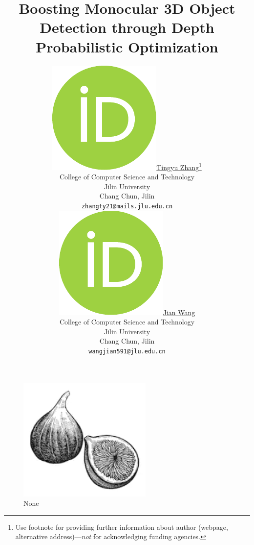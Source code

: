 \documentclass{article}
\title{Boosting Monocular 3D Object Detection through Depth Probabilistic Optimization}
\author{ \href{https://orcid.org/0000-0002-2277-8871}{\includegraphics[scale=0.06]{orcid.pdf}\hspace{1mm}Tingyu Zhang}\thanks{Use footnote for providing further
		information about author (webpage, alternative
		address)---\emph{not} for acknowledging funding agencies.} \\
	College of Computer Science and Technology\\
	Jilin University\\
	Chang Chun, Jilin \\
	\texttt{zhangty21@mails.jlu.edu.cn} \\
	\And
	\href{https://orcid.org/0000-0002-7701-8511}{\includegraphics[scale=0.06]{orcid.pdf}\hspace{1mm}Jian Wang} \\
	College of Computer Science and Technology\\
	Jilin University\\
	Chang Chun, Jilin \\
	\texttt{wangjian591@jlu.edu.cn} \\
}
\begin{document}
\maketitle

\begin{abstract}
	\lipsum[1]
\end{abstract}


\begin{figure}[!t]
	\centering
	\includegraphics[width=1.0\linewidth]{Figures/fig1}
	\caption{None}
	\label{fig:overview}
\end{figure}
\end{document}
